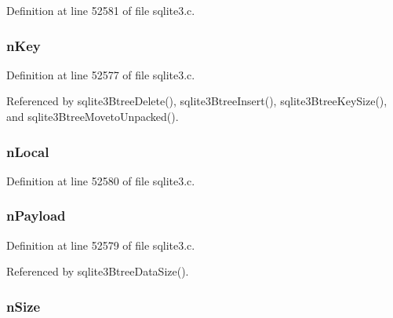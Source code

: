 Definition at line 52581 of file sqlite3.\+c.

\hypertarget{struct_cell_info_a528c39e09f68386edd6e2fbb64784561}{}
\subsubsection[{n\+Key}]{ n\+Key}\label{struct_cell_info_a528c39e09f68386edd6e2fbb64784561}


Definition at line 52577 of file sqlite3.\+c.



Referenced by sqlite3\+Btree\+Delete(), sqlite3\+Btree\+Insert(), sqlite3\+Btree\+Key\+Size(), and sqlite3\+Btree\+Moveto\+Unpacked().

\hypertarget{struct_cell_info_adfcb522da4fa98a0a28b8bae807881fc}{}
\subsubsection[{n\+Local}]{ n\+Local}\label{struct_cell_info_adfcb522da4fa98a0a28b8bae807881fc}


Definition at line 52580 of file sqlite3.\+c.

\hypertarget{struct_cell_info_a18261f92955ad0d6d9c5a3a7ad5111b0}{}
\subsubsection[{n\+Payload}]{ n\+Payload}\label{struct_cell_info_a18261f92955ad0d6d9c5a3a7ad5111b0}


Definition at line 52579 of file sqlite3.\+c.



Referenced by sqlite3\+Btree\+Data\+Size().

\hypertarget{struct_cell_info_a83ef3090f08d05f737462f2f36eddb97}{}
\subsubsection[{n\+Size}]{ n\+Size}\label{struct_cell_info_a83ef3090f08d05f737462f2f36eddb97}


